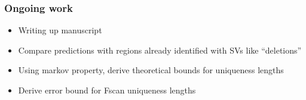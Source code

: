 \documentclass[10pt,dvipsnames,table]{beamer}
\begin{document}
\begin{frame}
\frametitle{Ongoing work}
\begin{itemize}
\item Writing up manuscript
\item Compare predictions with regions already identified with SVs like ``deletions''
\item Using markov property, derive theoretical bounds for uniqueness lengths
\item Derive error bound for Fscan uniqueness lengths
\end{itemize}
\end{frame}
\end{document}
